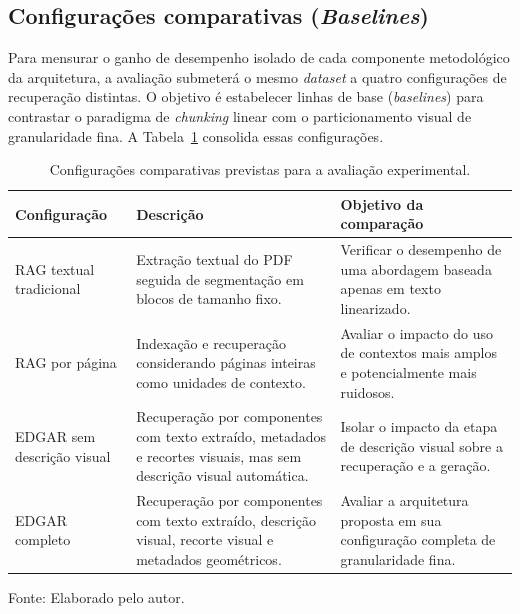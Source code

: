 \subsection{Configurações comparativas (\textit{Baselines})}
\label{subsec:configuracoes_comparativas}

Para mensurar o ganho de desempenho isolado de cada componente metodológico da arquitetura, a avaliação submeterá o mesmo \textit{dataset} a quatro configurações de recuperação distintas. O objetivo é estabelecer linhas de base (\textit{baselines}) para contrastar o paradigma de \textit{chunking} linear com o particionamento visual de granularidade fina. A Tabela~\ref{tab:configuracoes_comparativas} consolida essas configurações.

\begin{table}[H]
\centering
\caption{Configurações comparativas previstas para a avaliação experimental.}
\label{tab:configuracoes_comparativas}

\begin{minipage}{\textwidth}
\renewcommand{\arraystretch}{1.3}
\begin{tabularx}{\textwidth}{|p{3.2cm}|p{5.0cm}|X|}
\hline
\textbf{Configuração} & \textbf{Descrição} & \textbf{Objetivo da comparação} \\
\hline

RAG textual tradicional
& Extração textual do PDF seguida de segmentação em blocos de tamanho fixo.
& Verificar o desempenho de uma abordagem baseada apenas em texto linearizado. \\
\hline

RAG por página
& Indexação e recuperação considerando páginas inteiras como unidades de contexto.
& Avaliar o impacto do uso de contextos mais amplos e potencialmente mais ruidosos. \\
\hline

EDGAR sem descrição visual
& Recuperação por componentes com texto extraído, metadados e recortes visuais, mas sem descrição visual automática.
& Isolar o impacto da etapa de descrição visual sobre a recuperação e a geração. \\
\hline

EDGAR completo
& Recuperação por componentes com texto extraído, descrição visual, recorte visual e metadados geométricos.
& Avaliar a arquitetura proposta em sua configuração completa de granularidade fina. \\
\hline

\end{tabularx}

\par\vspace{0.1cm}
{\raggedright\footnotesize Fonte: Elaborado pelo autor.\par}
\end{minipage}
\end{table}

